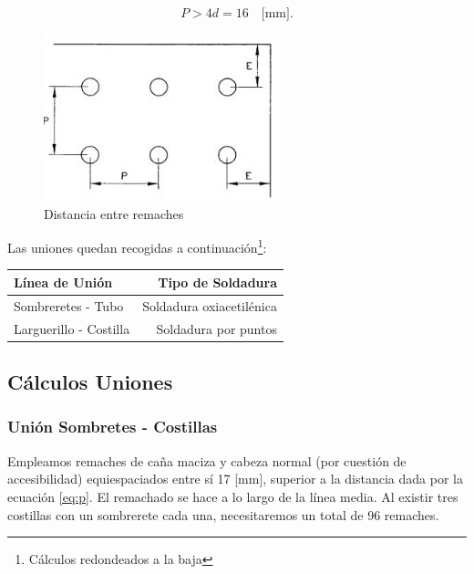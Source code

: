 \begin{equation} \label{eq:p}
    P > 4d = 16 \quad \text{[mm]}.
\end{equation}

\begin{figure}[!htb]
    \centering
    \includegraphics[width=0.3\linewidth]{Figures/distancia.png}
    \caption{Distancia entre remaches}
    \label{fig:dist}
\end{figure}

Las uniones quedan recogidas a continuación\footnote{Cálculos redondeados a la baja}:

\begin{table}[!htb]\centering

\begin{tabular}{|l|r|}\hline
\rowcolor[HTML]{C0C0C0}\textbf{Línea de Unión} 
& \textbf{Tipo de Soldadura}\\\hline
Sombreretes - Tubo & Soldadura oxiacetilénica \\\hline
Larguerillo - Costilla & Soldadura por puntos \\\hline
\end{tabular}
\end{table}

\begin{landscape}
    \vspace*{\fill}
    
    \vspace*{\fill}
    \clearpage
\end{landscape}

\subsection{Cálculos Uniones}
\subsubsection{Unión Sombretes - Costillas}
Empleamos remaches de caña maciza y cabeza normal (por cuestión de accesibilidad) equiespaciados entre sí 17 [mm], superior a la distancia dada por la ecuación \ref{eq:p}. El remachado se hace a lo largo de la línea media. Al existir tres costillas con un sombrerete cada una, necesitaremos un total de 96 remaches.

